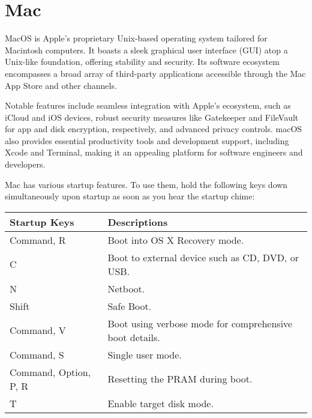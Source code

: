 \chapter{Mac}
\thispagestyle{fancy}
\lstset{language=Bash, style=shellstyle}

MacOS is Apple's proprietary Unix-based operating system tailored for Macintosh computers. It boasts a sleek graphical user interface (GUI) atop a Unix-like foundation, offering stability and security. Its software ecosystem encompasses a broad array of third-party applications accessible through the Mac App Store and other channels.

Notable features include seamless integration with Apple's ecosystem, such as iCloud and iOS devices, robust security measures like Gatekeeper and FileVault for app and disk encryption, respectively, and advanced privacy controls. macOS also provides essential productivity tools and development support, including Xcode and Terminal, making it an appealing platform for software engineers and developers.


\begin{fancybox}{}	
	Mac has various startup features. To use them, hold the following keys down simultaneously upon startup as soon as you hear the startup chime:
	\begin{center}
		\begin{tabular}{l|l}
			Startup Keys & Descriptions \\
			\hline
			Command, R & Boot into OS X Recovery mode. \\
			C & Boot to external device such as CD, DVD, or USB. \\
			N & Netboot. \\
			Shift & Safe Boot. \\
			Command, V & Boot using verbose mode for comprehensive boot details. \\
			Command, S & Single user mode. \\
			Command, Option, P, R & Resetting the PRAM during boot. \\
			T & Enable target disk mode.
		\end{tabular}
	\end{center}
\end{fancybox}



